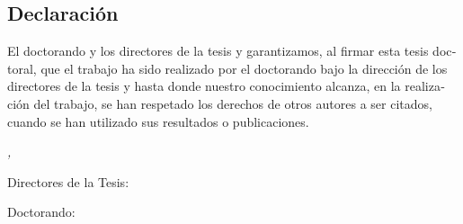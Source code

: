 \begin{otherlanguage}{spanish}
\chapter*{Declaración}

\thispagestyle{empty}
\bigskip
El doctorando \myName y los directores de la tesis \myProf y \myOtherProf garantizamos, al firmar esta tesis doctoral, que el trabajo ha sido realizado por el doctorando bajo la dirección de los directores de la tesis y hasta donde nuestro conocimiento alcanza, en la realización del trabajo, se han respetado los derechos de otros autores a ser citados, cuando se han utilizado sus resultados o publicaciones.  

\bigskip
\bigskip
\noindent\textit{\myLocation, \myTime}

\bigskip
\bigskip


\noindent\begin{minipage}[t]{0.45\textwidth}
\centering Directores de la Tesis: \\

\bigskip
\bigskip
\bigskip
\bigskip
\bigskip
\myProf

\bigskip
\bigskip
\bigskip
\bigskip
\bigskip
\myOtherProf
\end{minipage} 
\hfill
\noindent\begin{minipage}[t]{0.45\textwidth}
\centering Doctorando: 
\bigskip
\bigskip
\bigskip
\bigskip
\bigskip

\myName
\end{minipage}

\end{otherlanguage}
